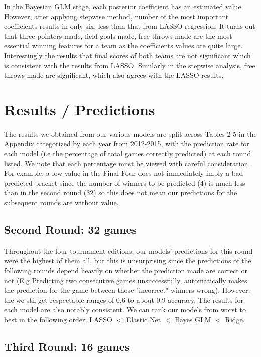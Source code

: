 \documentclass{article} %
\begin{document}
In the Bayesian GLM stage, each posterior coefficient has an estimated value. However, after applying stepwise method, number of the most important coefficients results in only six, less than that from LASSO regression. It turns out that three pointers made, field goals made, free throws made are the most essential winning features for a team as the coefficients values are quite large. Interestingly the results that final scores of both teams are not significant which is consistent with the results from LASSO. Similarly in the stepwise analysis, free throws made are significant, which also agrees with the LASSO results.

\section{Results / Predictions}

The results we obtained from our various models are split across Tables 2-5 in the Appendix categorized by each year from 2012-2015, with the prediction rate for each model (i.e the percentage of total games correctly predicted) at each round listed. We note that each percentage must be viewed with careful consideration. For example, a low value in the Final Four does not immediately imply a bad predicted bracket since the number of winners to be predicted (4) is much less than in the second round (32) so this does not mean our predictions for the subsequent rounds are without value.

\subsection{Second Round: 32 games}

Throughout the four tournament editions, our models' predictions for this round were the highest of them all, but this is unsurprising since the predictions of the following rounds depend heavily on whether the prediction made are correct or not (E.g Predicting two consecutive games unsuccessfully, automatically makes the prediction for the game between those "incorrect" winners wrong). However, the we stil get respectable ranges of 0.6 to about 0.9 accuracy. The results for each model are also notably consistent. We can rank our models from worst to best in the following order: LASSO $<$ Elastic Net $<$ Bayes GLM $<$ Ridge.

\subsection{Third Round: 16 games}
\end{document}
